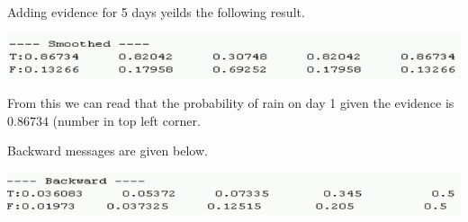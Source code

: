 \documentclass{article}
\begin{document}
Adding evidence for 5 days yeilds the following result.

\includegraphics[width=\linewidth]{smoothing_result.png}

From this we can read that the probability of rain on day 1 given the evidence is $0.86734$ (number in top left corner. 


Backward messages are given below.

\includegraphics[width=\linewidth]{backward_result.png}
\end{document}
